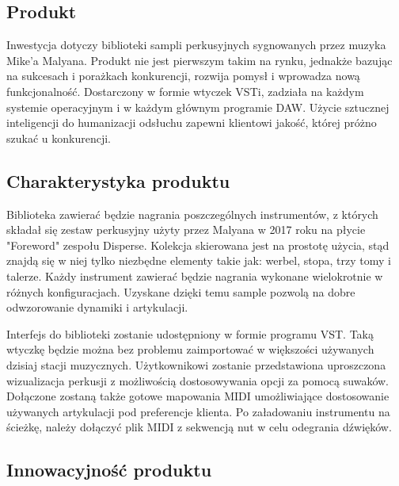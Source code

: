 \documentclass[12pt]{article}
\begin{document}


\subsection{Produkt}

Inwestycja dotyczy biblioteki sampli perkusyjnych sygnowanych przez muzyka
Mike'a Malyana. Produkt nie jest pierwszym takim na rynku, jednakże bazując na
sukcesach i porażkach konkurencji, rozwija pomysł i wprowadza nową
funkcjonalność. Dostarczony w formie wtyczek VSTi, zadziała na każdym systemie
operacyjnym i w każdym głównym programie DAW. Użycie sztucznej inteligencji do
humanizacji odsłuchu zapewni klientowi jakość, której próżno szukać u
konkurencji.

\subsection{Charakterystyka produktu}

Biblioteka zawierać będzie nagrania poszczególnych instrumentów, z których
składał się zestaw perkusyjny użyty przez Malyana w 2017 roku na płycie
"Foreword" zespołu Disperse. Kolekcja skierowana jest na prostotę użycia, stąd
znajdą się w niej tylko niezbędne elementy takie jak: werbel, stopa, trzy tomy
i talerze. Każdy instrument zawierać będzie nagrania wykonane wielokrotnie w
różnych konfiguracjach. Uzyskane dzięki temu sample pozwolą na dobre
odwzorowanie dynamiki i artykulacji.

Interfejs do biblioteki zostanie udostępniony w formie programu VST. Taką
wtyczkę będzie można bez problemu zaimportować w większości używanych dzisiaj
stacji muzycznych. Użytkownikowi zostanie przedstawiona uproszczona
wizualizacja perkusji z możliwością dostosowywania opcji za pomocą suwaków.
Dołączone zostaną także gotowe mapowania MIDI umożliwiające dostosowanie
używanych artykulacji pod preferencje klienta. Po załadowaniu instrumentu na
ścieżkę, należy dołączyć plik MIDI z sekwencją nut w celu odegrania dźwięków.

\subsection{Innowacyjność produktu}
\end{document}
